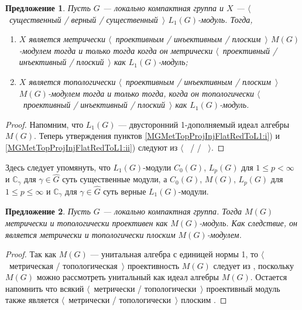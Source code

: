 \documentclass{article}
\numberwithin{equation}{section}
\theoremstyle{plain}
\newtheorem{propos}{Предложение}
\theoremstyle{definition}
\newtheorem{proof}{Доказательство}\def\theproof{}
\begin{document}
\begin{fulltext}
\begin{propos}\label{MGMetTopProjInjFlatRedToL1} Пусть $G$ --- локально компактная 
группа и $X$ --- $\langle$~существенный / верный / существенный~$\rangle$ 
$L_1(G)$-модуль. Тогда,
\begin{enumerate}
    \item $X$ является метрически 
    $\langle$~проективным / инъективным / плоским~$\rangle$ $M(G)$-модулем 
    тогда и только тогда когда он метрически 
    $\langle$~проективный / инъективный / плоский~$\rangle$ как $L_1(G)$-модуль;
    \label{MGMetTopProjInjFlatRedToL1:i}
    \item $X$ является топологически 
    $\langle$~проективным / инъективным / плоским~$\rangle$ $M(G)$-модулем 
    тогда и только тогда, когда он топологически 
    $\langle$~проективный / инъективный / плоский~$\rangle$ как $L_1(G)$-модуль.
    \label{MGMetTopProjInjFlatRedToL1:ii}
\end{enumerate}
\end{propos}
\begin{proof} Напомним, что $L_1(G)$ --- двусторонний 1-дополняемый идеал алгебры 
$M(G)$. Теперь утверждения пунктов \ref{MGMetTopProjInjFlatRedToL1:i}) и 
\ref{MGMetTopProjInjFlatRedToL1:ii}) следуют из 
$\langle$~\cite[предложение~2.6]{NemGeomProjInjFlatBanMod} / 
\cite[предложение~2.16]{NemGeomProjInjFlatBanMod} / 
\cite[предложение~2.24]{NemGeomProjInjFlatBanMod}~$\rangle$.
\end{proof} 

Здесь следует упомянуть, что $L_1(G)$-модули $C_0(G)$, $L_p(G)$ для $1\leq p<\infty$ 
и $\mathbb{C}_\gamma$ для $\gamma\in\widehat{G}$ суть существенные модули, а 
$C_0(G)$, $M(G)$, $L_p(G)$ для $1\leq p\leq \infty$ и $\mathbb{C}_\gamma$ 
для $\gamma\in\widehat{G}$ суть верные $L_1(G)$-модули. 

\begin{propos}\label{MGModMGMetTopProjFlatCharac} Пусть $G$ --- локально компактная 
группа. Тогда $M(G)$ метрически и топологически проективен как $M(G)$-модуль. 
Как следствие, он является метрически и топологически плоским $M(G)$-модулем.
\end{propos} 
\begin{proof} Так как $M(G)$ --- унитальная алгебра с единицей нормы 1, то 
$\langle$~метрическая / топологическая~$\rangle$ проективность $M(G)$ следует 
из \cite[предложение~7]{NemMetTopProjIdBanAlg}, поскольку $M(G)$ можно 
рассмотреть унитальный как идеал алгебры $M(G)$. Остается напомнить что всякий 
$\langle$~метрически / топологически~$\rangle$ проективный модуль также 
является $\langle$~метрически / топологически~$\rangle$ плоским 
\cite[предложение~2.26]{NemGeomProjInjFlatBanMod}.
\end{proof}


\end{fulltext}
\end{document}

